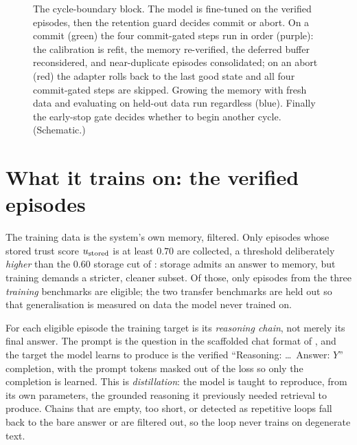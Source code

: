 \begin{figure}[htbp]
\caption[One cycle, in order]{The cycle-boundary block. The model is fine-tuned on the
verified episodes, then the retention guard decides commit or abort. On a commit
(green) the four commit-gated steps run in order (purple): the calibration is refit, the
memory re-verified, the deferred buffer reconsidered, and near-duplicate episodes
consolidated; on an abort (red) the adapter rolls back to the last good state and all four
commit-gated steps are skipped. Growing the memory with fresh data and evaluating on
held-out data run regardless (blue). Finally the early-stop gate decides whether to begin
another cycle. (Schematic.)}
\label{fig:cycle-master}
\end{figure}

\section{What it trains on: the verified episodes}
\label{sec:cycle-data}

The training data is the system's own memory, filtered. Only episodes whose stored trust
score $u_{\text{stored}}$ is at least $0.70$ are collected, a threshold deliberately \emph{higher}
than the $0.60$ storage cut of : storage admits an answer to memory,
but training demands a stricter, cleaner subset. Of those, only episodes from the three
\emph{training} benchmarks are eligible; the two transfer benchmarks are held out so that
generalisation is measured on data the model never trained on.

\begin{precise}
For each eligible episode the training target is its \emph{reasoning chain}, not merely
its final answer. The prompt is the question in the scaffolded chat format of
, and the target the model learns to produce is the verified
``Reasoning: \dots\ Answer: $Y$'' completion, with the prompt tokens masked out of the
loss so only the completion is learned. This is \emph{distillation}: the model is taught
to reproduce, from its own parameters, the grounded reasoning it previously needed
retrieval to produce. Chains that are empty, too short, or detected as repetitive loops
fall back to the bare answer or are filtered out, so the loop never trains on degenerate
text.
\end{precise}

